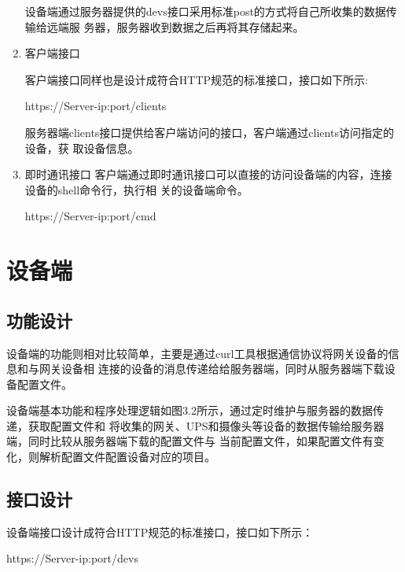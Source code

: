 \documentclass[a4paper,12pt]{report}
\begin{document}
\begin{spacing}{1.5}
\begin{enumerate}[(1)]
        设备端通过服务器提供的devs接口采用标准post的方式将自己所收集的数据传输给远端服
        务器，服务器收到数据之后再将其存储起来。
    \item 客户端接口

        客户端接口同样也是设计成符合HTTP规范的标准接口，接口如下所示:
        \begin{tcolorbox}[notitle,boxrule=0pt,colback=blue!20,colframe=blue!20]
            https://Server-ip:port/clients
        \end{tcolorbox}
        服务器端clients接口提供给客户端访问的接口，客户端通过clients访问指定的设备，获
        取设备信息。
    \item 即时通讯接口
        客户端通过即时通讯接口可以直接的访问设备端的内容，连接设备的shell命令行，执行相
        关的设备端命令。
        \begin{tcolorbox}[notitle,boxrule=0pt,colback=blue!20,colframe=blue!20]
            https://Server-ip:port/cmd \cite{rtty.web}
        \end{tcolorbox}

\end{enumerate}


\section{设备端}
\subsection{功能设计}
设备端的功能则相对比较简单，主要是通过curl工具根据通信协议将网关设备的信息和与网关设备相
连接的设备的消息传递给给服务器端，同时从服务器端下载设备配置文件。


设备端基本功能和程序处理逻辑如图3.2所示，通过定时维护与服务器的数据传递，获取配置文件和
将收集的网关、UPS和摄像头等设备的数据传输给服务器端，同时比较从服务器端下载的配置文件与
当前配置文件，如果配置文件有变化，则解析配置文件配置设备对应的项目。

\subsection{接口设计}
设备端接口设计成符合HTTP规范的标准接口，接口如下所示：
    \begin{tcolorbox}[notitle,boxrule=0pt,colback=blue!20,colframe=blue!20]
        \quad https://Server-ip:port/devs
    \end{tcolorbox}


\end{spacing}
\end{document}

